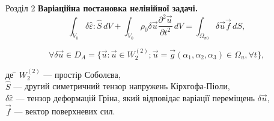 \documentclass[8pt]{beamer}
\numberwithin{figure}{section}
\numberwithin{equation}{section}
\numberwithin{table}{section}
\begin{document}
\begin{frame}{Розділ 2}
\textbf{Варіаційна постановка нелінійної задачі.}\\
\vspace{1em}
\begin{equation}\label{eq:virtwork_gen}
\int_{V_0} \delta\hat{\varepsilon}:\hat{S}\,dV+\int_{V_0} \rho_0 \delta\vec{u} \frac{\partial^2 \vec{u}}{\partial t ^2}\,dV=\int_{\Omega_{\sigma0}} \delta\vec{u} \vec{f} \,dS,
\end{equation}

\[
\forall \delta\vec{u} \in D_A 
= \{ 
\vec{u}:\vec{u}\in W_2^{(2)}; 
\vec{u}=\vec{g} \left( \alpha_1, \alpha_2,\alpha_3 \right) \in \Omega_{u}, \forall t \},
\]

\begin{tabbing}
де \= $ W_2^{(2)}$ --- простір Соболєва,\\
\> $\hat{S}$ --- другий симетричний тензор напружень Кірхгофа-Піоли,\\
\> $\delta\hat{\varepsilon}$ --- тензор деформацій Гріна, який відповідає варіації переміщень $\delta\vec{u}$,\\
\> $\vec{f}$ --- вектор поверхневих сил.
\end{tabbing}

\end{frame}
\end{document}
